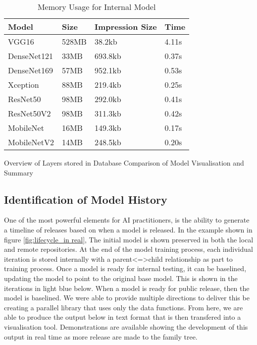 \begin{table}[!ht]
    \centering
    \caption{Memory Usage for Internal Model}
    \label{table:memory}
    \setlength\tabcolsep{0pt} %
    \begin{tabular}{@{} p{2cm} p{2cm} p{2cm} p{1cm}  @{}}
        \hline
        Model & Size & Impression Size & Time\\
        \hline
        VGG16       & 528MB & 38.2kb & 4.11s \\
        DenseNet121	& 33MB & 693.8kb & 0.37s \\
        DenseNet169	& 57MB & 952.1kb & 0.53s \\
        Xception	& 88MB & 219.4kb & 0.25s \\
        ResNet50	& 98MB & 292.0kb & 0.41s \\
        ResNet50V2	& 98MB & 311.3kb & 0.42s \\
        MobileNet	& 16MB & 149.3kb & 0.17s \\
        MobileNetV2	& 14MB & 248.5kb & 0.20s \\
        \hline
    \end{tabular}
\end{table}

    Overview of Layers stored in Database
    Comparison of Model Visualisation and Summary

\subsection{Identification of Model History}

One of the most powerful elements for AI practitioners, is the ability to generate a timeline of releases based on when a model is released. In the example shown in figure \ref{fig:lifecycle_in real}, The initial model is shown preserved in both the local and remote repositories. At the end of the model training process, each individual iteration is stored internally with a parent<=>child relationship as part to training process. Once a model is ready for internal testing, it can be baselined, updating the model to point to the original base model. This is shown in the iterations in light blue below. When a model is ready for public release, then the model is baselined. We were able to provide multiple directions to deliver this be creating a parallel library that uses only the data functions. From here, we are able to produce the output below in text format that is then transfered into a visualisation tool. Demonstrations are available showing the development of this output in real time as more release are made to the family tree.

